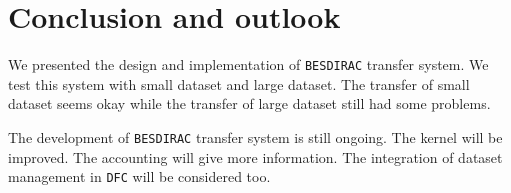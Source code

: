 \section{Conclusion and outlook}
We presented the design and implementation of {\tt BESDIRAC} transfer system.
We test this system with small dataset and large dataset.
The transfer of small dataset seems okay while the transfer of large
dataset still had some problems.

The development of {\tt BESDIRAC} transfer system is still ongoing.
The kernel will be improved.
The accounting will give more information.
The integration of dataset management in {\tt DFC} will be considered too.
